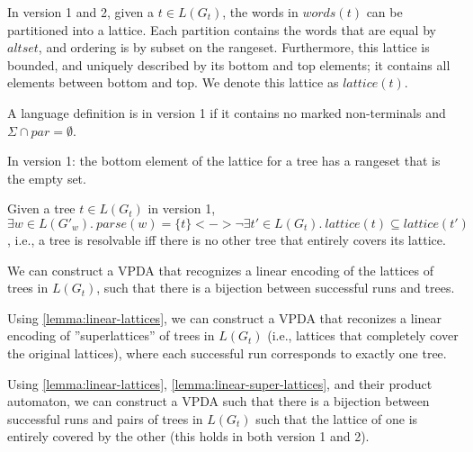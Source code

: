 \documentclass[acmsmall,review,anonymous]{acmart}\settopmatter{printfolios=true,printccs=false,printacmref=false}
\newcommand{\T}{\Sigma} %
\newcommand{\parse}{\mathit{parse}} %
\newcommand{\words}{\mathit{words}} %
\newcommand{\alt}{\mathit{alt}} %
\newcommand{\altset}{\mathit{altset}} %
\newcommand{\lattice}{\mathit{lattice}} %
\begin{document}
\begin{lemma}
In version 1 and 2, given a $t \in L(G_t)$, the words in $\words(t)$ can be partitioned into a lattice. Each partition contains the words that are equal by $\altset$, and ordering is by subset on the rangeset. Furthermore, this lattice is bounded, and uniquely described by its bottom and top elements; it contains all elements between bottom and top. We denote this lattice as $\lattice(t)$.
\label{lemma:bounded-lattice}
\end{lemma}

\begin{definition}
A language definition is in version 1 if it contains no marked non-terminals and $\T \cap \mathit{par} = \emptyset$.
\end{definition}

\begin{lemma}
In version 1: the bottom element of the lattice for a tree has a rangeset that is the empty set.
\end{lemma}

\begin{theorem}
Given a tree $t \in L(G_t)$ in version 1, $\exists w \in L(G'_w).\ \parse(w) = \{t\} <-> \neg \exists t' \in L(G_t).\ \lattice(t) \subseteq \lattice(t')$, i.e., a tree is resolvable iff there is no other tree that entirely covers its lattice.
\end{theorem}

\begin{lemma}
We can construct a VPDA that recognizes a linear encoding of the lattices of trees in $L(G_t)$, such that there is a bijection between successful runs and trees.
\label{lemma:linear-lattices}
\end{lemma}

\begin{lemma}
Using \ref{lemma:linear-lattices}, we can construct a VPDA that reconizes a linear encoding of ''superlattices'' of trees in $L(G_t)$ (i.e., lattices that completely cover the original lattices), where each successful run corresponds to exactly one tree.
\label{lemma:linear-super-lattices}
\end{lemma}

\begin{theorem}
Using \ref{lemma:linear-lattices}, \ref{lemma:linear-super-lattices}, and their product automaton, we can construct a VPDA such that there is a bijection between successful runs and pairs of trees in $L(G_t)$ such that the lattice of one is entirely covered by the other (this holds in both version 1 and 2).
\end{theorem}
\end{document}
